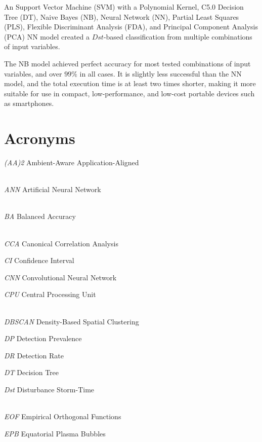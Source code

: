 \documentclass[sn-mathphys-num]{sn-jnl}%
\begin{document}
An Support Vector Machine (SVM) with a Polynomial Kernel, C5.0 Decision Tree (DT), Naive Bayes (NB), Neural Network (NN), Partial Least Squares (PLS), Flexible Discriminant Analysis (FDA), and Principal Component Analysis (PCA) NN model created a $Dst$-based classification from multiple combinations of input variables.

The NB model achieved perfect accuracy for most tested combinations of input variables, and over $99\%$ in all cases. It is slightly less successful than the NN model, and the total execution time is at least two times shorter, making it more suitable for use in compact, low-performance, and low-cost portable devices such as smartphones.

\clearpage

\section{Acronyms}
\label{sec:Acronyms}

\textit{(AA)2} Ambient-Aware Application-Aligned


\\[2\baselineskip]

\textit{ANN} Artificial Neural Network


\\[2\baselineskip]

\textit{BA} Balanced Accuracy


\\[2\baselineskip]

\textit{CCA} Canonical Correlation Analysis

\textit{CI} Confidence Interval

\textit{CNN} Convolutional Neural Network

\textit{CPU} Central Processing Unit


\\[2\baselineskip]

\textit{DBSCAN} Density-Based Spatial Clustering

\textit{DP} Detection Prevalence

\textit{DR} Detection Rate

\textit{DT} Decision Tree

\textit{Dst} Disturbance Storm-Time


\\[2\baselineskip]

\textit{EOF} Empirical Orthogonal Functions

\textit{EPB} Equatorial Plasma Bubbles
\end{document}
